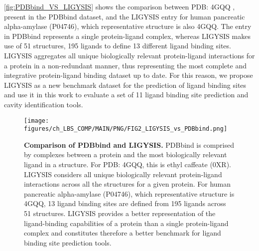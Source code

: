 \FloatBarrier


\autoref{fig:PDBbind_VS_LIGYSIS} shows the comparison between PDB: 4GQQ \cite{WILLIAMS_2012_AMYLASE}, present in the PDBbind dataset, and the LIGYSIS entry for human pancreatic alpha-amylase (P04746), which representative structure is also 4GQQ. The entry in PDBbind represents a single protein-ligand complex, whereas LIGYSIS makes use of 51 structures, 195 ligands to define 13 different ligand binding sites. LIGYSIS aggregates all unique biologically relevant protein-ligand interactions for a protein in a non-redundant manner, thus representing the most complete and integrative protein-ligand binding dataset up to date. For this reason, we propose LIGYSIS as a new benchmark dataset for the prediction of ligand binding sites and use it in this work to evaluate a set of 11 ligand binding site prediction and cavity identification tools.

\begin{figure}[htb!]
    \centering
    \texttt{[image: figures/ch\_LBS\_COMP/MAIN/PNG/FIG2\_LIGYSIS\_vs\_PDBbind.png]}
    \caption[Comparison of PDBbind and LIGYSIS]{\textbf{Comparison of PDBbind and LIGYSIS.} PDBbind is comprised by complexes between a protein and the most biologically relevant ligand in a structure. For PDB: 4GQQ, this is ethyl caffeate (0XR). LIGYSIS considers all unique biologically relevant protein-ligand interactions across all the structures for a given protein. For human pancreatic alpha-amylase (P04746), which representative structure is 4GQQ, 13 ligand binding sites are defined from 195 ligands across 51 structures. LIGYSIS provides a better representation of the ligand-binding capabilities of a protein than a single protein-ligand complex and constitutes therefore a better benchmark for ligand binding site prediction tools.}
    \label{fig:PDBbind_VS_LIGYSIS}
\end{figure}

